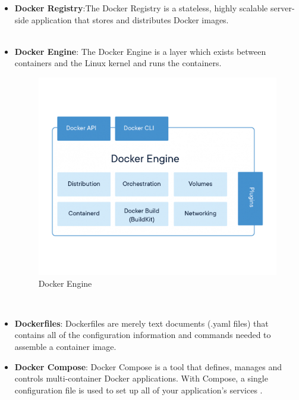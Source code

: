 \documentclass[11pt]{report}
\begin{document}
\begin{enumerate}
\begin{itemize}
			\item
			\textbf{Docker Registry}:The Docker Registry is a stateless, highly scalable server-side application that stores and distributes Docker images. 
			\ \\
			\ \\
			\item
			\textbf{Docker Engine}: The Docker Engine is a layer which exists between containers and the Linux kernel and runs the containers.
			\\
			\begin{figure}[h!]
    	\begin{center}
    		\includegraphics[scale=0.4]{docker-engine.png}
    		\caption{Docker Engine \cite{DockerEngine}}
    	  \end{center}
	   \end{figure}
			
			
			\ \\
			\item
			\textbf{Dockerfiles}: Dockerfiles are merely text documents (.yaml files) that contains all of the configuration information and commands needed to assemble a container image.
			\item
			\textbf{Docker Compose}: Docker Compose is a tool that defines, manages and controls multi-container Docker applications. With Compose, a single configuration file is used to set up all of your application’s services .
			

\end{itemize}
\end{enumerate}
\end{document}
